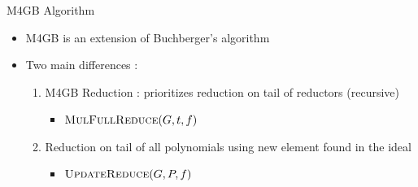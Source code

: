 \documentclass{beamer}
\newcommand{\LM}[1]{\mathsf{LM}(#1)}
\newcommand{\Tail}[1]{\mathsf{Tail}(#1)}
\begin{document}
\begin{section}{M4GB Algorithm}

      
    

  \begin{frame}{}
    \begin{itemize}
    \item M4GB is an extension of Buchberger's algorithm
    \item<2-> Two main differences :
      \begin{enumerate}
      \item<3-> M4GB Reduction : prioritizes reduction on tail of
        reductors (recursive)
        \begin{itemize}
        \item $\textsc{MulFullReduce}(G, t, f)$
        \end{itemize}
      \item<4-> Reduction on tail of all polynomials using new element
        found in the ideal
        \begin{itemize}
        \item $\textsc{UpdateReduce}(G, P, f)$
        \end{itemize}
      \end{enumerate}
    \end{itemize}
  \end{frame}
  

\end{section}
\end{document}
